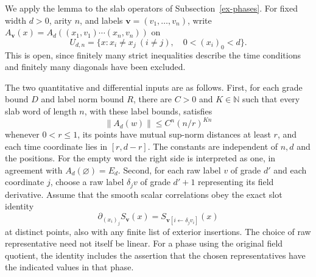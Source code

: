 We apply the lemma to the slab operators of Subsection~\ref{ex-phases}.
For fixed width \(d>0\), arity \(n\), and labels
\(\boldsymbol v=(v_1,\ldots,v_n)\), write
\(A_{\boldsymbol v}(x)=A_d((x_1,v_1)\cdots(x_n,v_n))\) on
\[
 U_{d,n}=\{x:x_i\ne x_j\ (i\ne j),\quad0<(x_i)_0<d\}.
\]
This is open, since finitely many strict inequalities describe the time
conditions and finitely many diagonals have been excluded.

The two quantitative and differential inputs are as follows. First, for
each grade bound \(D\) and label norm bound \(R\), there are
\(C>0\) and \(K\in\mathbb N\) such that every slab word of length
\(n\), with these label bounds, satisfies
\begin{equation}\label{ex-all-copy-bound}
 \|A_d(w)\|\le C^n(n/r)^{Kn}
\end{equation}
whenever \(0<r\le1\), its points have mutual sup-norm distances at
least \(r\), and each time coordinate lies in \([r,d-r]\).
The constants are independent of \(n,d\) and the positions.
For the empty word the right side is interpreted as one, in agreement
with \(A_d(\varnothing)=E_d\).
Second, for each raw label \(v\) of grade \(d'\) and each coordinate
\(j\), choose a raw label \(\delta_jv\) of grade \(d'+1\) representing
its field derivative. Assume that the smooth scalar correlations obey
the exact slot identity
\begin{equation}\label{ex-raw-slot-identity}
 \partial_{(x_i)_j}S_{\boldsymbol v}(x)
 =S_{\boldsymbol v[i\leftarrow\delta_jv_i]}(x)
\end{equation}
at distinct points, also with any finite list of exterior insertions.
The choice of raw representative need not itself be linear. For a phase
using the original field quotient, the identity includes the assertion
that the chosen representatives have the indicated values in that phase.

